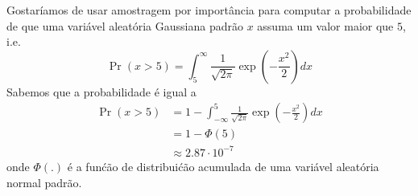 
\label{ex:importance-sampling-to-estimate-tail-probabilities}
Gostar\'iamos de usar amostragem por import\^ancia para computar a probabilidade
de que uma vari\'avel aleat\'oria Gaussiana padr\~ao $x$ assuma um valor maior
que $5$, i.e.
\begin{equation}
    \Pr(x>5) = \int_{5}^\infty \frac{1}{\sqrt{2\pi}} \exp\left(-\frac{x^2}{2}\right) dx
\end{equation}
Sabemos que a probabilidade \'e igual a
\begin{align}
    \Pr(x>5) & = 1-\int_{-\infty}^5 \frac{1}{\sqrt{2\pi}} \exp\left(-\frac{x^2}{2}\right) dx\\
    & = 1-\Phi(5)\\
    & \approx 2.87 \cdot 10^{-7}
\end{align}
onde $\Phi(.)$ \'e a fun\'c\~ao de distribui\'c\~ao acumulada de uma vari\'avel
aleat\'oria normal padr\~ao.

